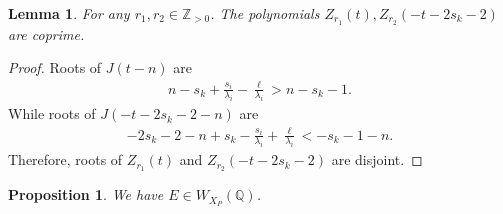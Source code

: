 \documentclass[11pt,a4paper,usenames,dvipsnames,reqno]{amsart}
\numberwithin{equation}{section}
\newcommand{\cc}{\mathbb C}
\newcommand{\zz}{\mathbb Z}
\newcommand{\qq}{\mathbb Q}
\newtheorem{Prop}[Thm]{Proposition}
\newtheorem{Lem}[Thm]{Lemma}
\theoremstyle{definition}
\theoremstyle{remark}
\newtheorem{Rem}[Thm]{Remark}
\begin{document}

\begin{Lem}\label{lem:coprime}
For any $r_1,r_2\in \zz_{>0}$. The polynomials $Z_{r_1}(t), Z_{r_2}(-t-2s_k-2)$ are coprime.
\end{Lem}

\begin{proof}
Roots of $J(t-n)$ are
\begin{align*}
    n-s_k+\frac{s_i}{\lambda_i}-\frac{\ell}{\lambda_i}>n-s_k-1.
\end{align*}
While roots of $J(-t-2s_k-2-n)$ are
\begin{align*}
    -2s_k-2-n+s_k-\frac{s_i}{\lambda_i}+\frac{\ell}{\lambda_i}<-s_k-1-n.
\end{align*}
Therefore, roots of $Z_{r_1}(t)$ and $Z_{r_2}(-t-2s_k-2)$ are disjoint.
\end{proof}

\begin{Prop}\label{prop:E}
We have $E\in W_{X_P}(\qq)$.
\end{Prop}
\end{document}

